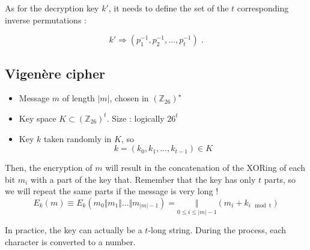 \documentclass[a4paper, 12pt]{book}
\begin{document}
As for the decryption key $k'$, it needs to define the set of the $t$ corresponding inverse permutations :

$$k' \Rightarrow (p_1^{-1}, p_2^{-1}, \dots, p_t^{-1}) \; .$$

\subsection{Vigenère cipher} 
\begin{itemize}
    \item Message $m$ of length $|m|$, chosen in $(\mathbb{Z}_{26})^\star$
    \item Key space $K \subset (\mathbb{Z}_{26})^t$. Size : logically $26^t$
    \item Key $k$ taken randomly in $K$, so 
    $$k = (k_0, k_1, \dots, k_{t-1}) \in K$$
\end{itemize}
Then, the encryption of $m$ will result in the concatenation of the XORing of each bit $m_i$ with a part of the key that. Remember that the key has only $t$ parts, so we will repeat the same parts if the message is very long !
$$E_k(m) \equiv E_k(m_0 \Vert m_1 \Vert \dots \Vert m_{|m|-1}) =  \underset{\scriptscriptstyle{0\leq i \leq |m|-1}}{\Vert} (m_i + k_{i  \mod{\mathrm{t}}})$$

In practice, the key can actually be a $t$-long string. During the process, each character is converted to a number.
\end{document}
